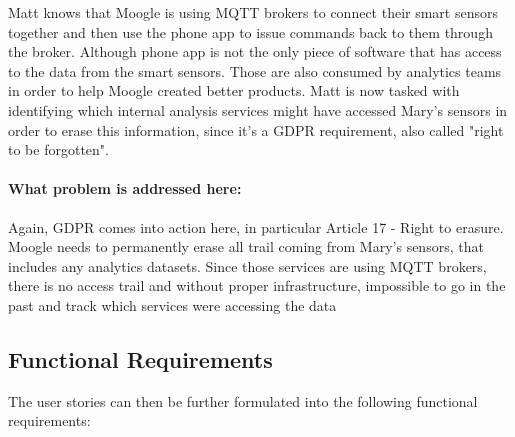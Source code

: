 Matt knows that Moogle is using MQTT brokers to connect their smart sensors together and then use the phone app to issue commands back to them through the broker. Although phone app is not the only piece of software that has access to the data from the smart sensors. Those are also consumed by analytics teams in order to help Moogle created better products. Matt is now tasked with identifying which internal analysis services might have accessed Mary's sensors in order to erase this information, since it's a GDPR requirement, also called "right to be forgotten".
\paragraph{\textbf{What problem is addressed here:}}
Again, GDPR comes into action here, in particular Article 17 - Right to erasure. Moogle needs to permanently erase all trail coming from Mary's sensors, that includes any analytics datasets. Since those services are using MQTT brokers, there is no access trail and without proper infrastructure, impossible to go in the past and track which services were accessing the data

\subsection{Functional Requirements}

The user stories can then be further formulated into the following functional requirements:

